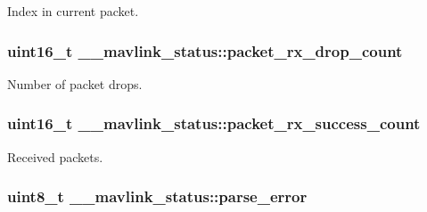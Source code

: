 Index in current packet. 

\subsubsection[{\texorpdfstring{packet\+\_\+rx\+\_\+drop\+\_\+count}{packet_rx_drop_count}}]{\setlength{\rightskip}{0pt plus 5cm}uint16\+\_\+t \+\_\+\+\_\+mavlink\+\_\+status\+::packet\+\_\+rx\+\_\+drop\+\_\+count}\hypertarget{struct____mavlink__status_a1a1f510b9484e705c971f20fd1d61912}{}\label{struct____mavlink__status_a1a1f510b9484e705c971f20fd1d61912}


Number of packet drops. 

\subsubsection[{\texorpdfstring{packet\+\_\+rx\+\_\+success\+\_\+count}{packet_rx_success_count}}]{\setlength{\rightskip}{0pt plus 5cm}uint16\+\_\+t \+\_\+\+\_\+mavlink\+\_\+status\+::packet\+\_\+rx\+\_\+success\+\_\+count}\hypertarget{struct____mavlink__status_aa088f67773cdf9ff541c5880e65cee68}{}\label{struct____mavlink__status_aa088f67773cdf9ff541c5880e65cee68}


Received packets. 

\subsubsection[{\texorpdfstring{parse\+\_\+error}{parse_error}}]{\setlength{\rightskip}{0pt plus 5cm}uint8\+\_\+t \+\_\+\+\_\+mavlink\+\_\+status\+::parse\+\_\+error}\hypertarget{struct____mavlink__status_ae7a52aa0c84929dbf181220c689f9ec8}{}\label{struct____mavlink__status_ae7a52aa0c84929dbf181220c689f9ec8}


